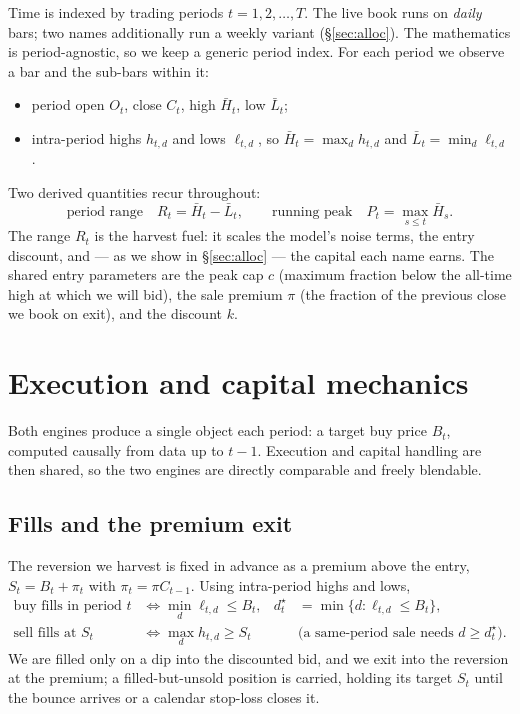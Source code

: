 \documentclass[11pt]{article}
\begin{document}
Time is indexed by trading periods $t=1,2,\dots,T$. The live book runs on \emph{daily} bars; two
names additionally run a weekly variant (\S\ref{sec:alloc}). The mathematics is period-agnostic,
so we keep a generic period index. For each period we observe a bar and the sub-bars within it:
\begin{itemize}[topsep=2pt,itemsep=1pt]
\item period open $O_t$, close $C_t$, high $\bar H_t$, low $\bar L_t$;
\item intra-period highs $h_{t,d}$ and lows $\ell_{t,d}$, so $\bar H_t=\max_d h_{t,d}$ and
      $\bar L_t=\min_d \ell_{t,d}$.
\end{itemize}
Two derived quantities recur throughout:
\begin{equation}
\text{period range}\quad R_t=\bar H_t-\bar L_t,\qquad
\text{running peak}\quad P_t=\max_{s\le t}\bar H_s .
\end{equation}
The range $R_t$ is the harvest fuel: it scales the model's noise terms, the entry discount, and
--- as we show in \S\ref{sec:alloc} --- the capital each name earns. The shared entry parameters
are the peak cap $c$ (maximum fraction below the all-time high at which we will bid), the sale
premium $\pi$ (the fraction of the previous close we book on exit), and the discount $k$.

\section{Execution and capital mechanics}

Both engines produce a single object each period: a target buy price $B_t$, computed causally
from data up to $t-1$. Execution and capital handling are then shared, so the two engines are
directly comparable and freely blendable.

\subsection{Fills and the premium exit}
The reversion we harvest is fixed in advance as a premium above the entry, $S_t=B_t+\pi_t$ with
$\pi_t=\pi C_{t-1}$. Using intra-period highs and lows,
\begin{align}
\text{buy fills in period }t &\iff \min_d \ell_{t,d}\le B_t,
  & d_t^{\star}&=\min\{d:\ell_{t,d}\le B_t\},\\
\text{sell fills at }S_t &\iff \max_d h_{t,d}\ge S_t
  &&\text{(a same-period sale needs } d\ge d_t^{\star}).
\end{align}
We are filled only on a dip into the discounted bid, and we exit into the reversion at the
premium; a filled-but-unsold position is carried, holding its target $S_t$ until the bounce
arrives or a calendar stop-loss closes it.
\end{document}
